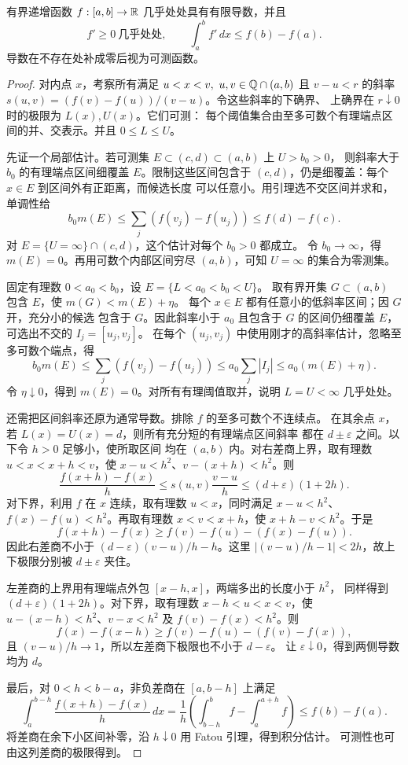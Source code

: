 \begin{theorem}\label{thm:monotone-ae-derivative}
有界递增函数 \(f:[a,b]\to\mathbb{R}\) 几乎处处具有有限导数，并且
\[
 f'\ge0\ \text{几乎处处},\qquad \int_a^b f'\,dx\le f(b)-f(a).
\]
导数在不存在处补成零后视为可测函数。
\end{theorem}
\begin{proof}
对内点 \(x\)，考察所有满足 \(u<x<v,\ u,v\in\mathbb{Q}\cap(a,b)\) 且
\(v-u<r\) 的斜率 \(s(u,v)=(f(v)-f(u))/(v-u)\)。令这些斜率的下确界、
上确界在 \(r\downarrow0\) 时的极限为 \(L(x),U(x)\)。它们可测：
每个阈值集合由至多可数个有理端点区间的并、交表示。并且 \(0\le L\le U\)。

先证一个局部估计。若可测集 \(E\subset(c,d)\subset(a,b)\) 上 \(U>b_0>0\)，
则斜率大于 \(b_0\) 的有理端点区间细覆盖 \(E\)。限制这些区间包含于
\((c,d)\)，仍是细覆盖：每个 \(x\in E\) 到区间外有正距离，而候选长度
可以任意小。用引理选不交区间并求和，
单调性给
\[
 b_0m(E)\le\sum_j(f(v_j)-f(u_j))\le f(d)-f(c).
\]
对 \(E=\{U=\infty\}\cap(c,d)\)，这个估计对每个 \(b_0>0\) 都成立。
令 \(b_0\to\infty\)，得 \(m(E)=0\)。再用可数个内部区间穷尽
\((a,b)\)，可知 \(U=\infty\) 的集合为零测集。

固定有理数 \(0<a_0<b_0\)，设 \(E=\{L<a_0<b_0<U\}\)。
取有界开集 \(G\subset(a,b)\) 包含 \(E\)，使 \(m(G)<m(E)+\eta\)。
每个 \(x\in E\) 都有任意小的低斜率区间；因 \(G\) 开，充分小的候选
包含于 \(G\)。因此斜率小于 \(a_0\) 且包含于 \(G\) 的区间仍细覆盖
\(E\)，可选出不交的 \(I_j=[u_j,v_j]\)。
在每个 \((u_j,v_j)\) 中使用刚才的高斜率估计，忽略至多可数个端点，得
\[
 b_0m(E)\le\sum_j(f(v_j)-f(u_j))
 \le a_0\sum_j|I_j|\le a_0(m(E)+\eta).
\]
令 \(\eta\downarrow0\)，得到 \(m(E)=0\)。对所有有理阈值取并，说明
\(L=U<\infty\) 几乎处处。

还需把区间斜率还原为通常导数。排除 \(f\) 的至多可数个不连续点。
在其余点 \(x\)，若 \(L(x)=U(x)=d\)，则所有充分短的有理端点区间斜率
都在 \(d\pm\varepsilon\) 之间。以下令 \(h>0\) 足够小，使所取区间
均在 \((a,b)\) 内。对右差商上界，取有理数 \(u<x<x+h<v\)，使
\(x-u<h^2\)、\(v-(x+h)<h^2\)。则
\[
 \frac{f(x+h)-f(x)}h
 \le s(u,v)\frac{v-u}{h}\le(d+\varepsilon)(1+2h).
\]
对下界，利用 \(f\) 在 \(x\) 连续，取有理数 \(u<x\)，同时满足
\(x-u<h^2\)、\(f(x)-f(u)<h^2\)。再取有理数 \(x<v<x+h\)，使
\(x+h-v<h^2\)。于是
\[
 f(x+h)-f(x)\ge f(v)-f(u)-(f(x)-f(u)).
\]
因此右差商不小于 \((d-\varepsilon)(v-u)/h-h\)。这里
\(|(v-u)/h-1|<2h\)，故上下极限分别被 \(d\pm\varepsilon\) 夹住。

左差商的上界用有理端点外包 \([x-h,x]\)，两端多出的长度小于 \(h^2\)，
同样得到 \((d+\varepsilon)(1+2h)\)。对下界，取有理数
\(x-h<u<x<v\)，使 \(u-(x-h)<h^2\)、\(v-x<h^2\) 及
\(f(v)-f(x)<h^2\)。则
\[
 f(x)-f(x-h)\ge f(v)-f(u)-(f(v)-f(x)),
\]
且 \((v-u)/h\to1\)，所以左差商下极限也不小于 \(d-\varepsilon\)。
让 \(\varepsilon\downarrow0\)，得到两侧导数均为 \(d\)。

最后，对 \(0<h<b-a\)，非负差商在 \([a,b-h]\) 上满足
\[
 \int_a^{b-h}\frac{f(x+h)-f(x)}h\,dx
 =\frac1h\left(\int_{b-h}^bf-\int_a^{a+h}f\right)
 \le f(b)-f(a).
\]
将差商在余下小区间补零，沿 \(h\downarrow0\) 用 Fatou 引理，得到积分估计。
可测性也可由这列差商的极限得到。
\end{proof}

